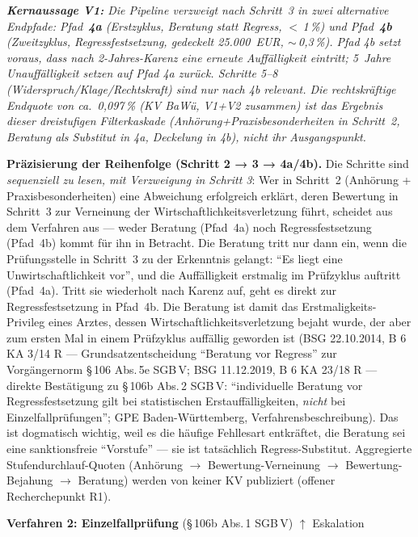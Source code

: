 \documentclass{umbruch-position}
\begin{document}
\smallskip
\noindent\textit{\textbf{Kernaussage V1:} Die Pipeline verzweigt nach Schritt~3 in zwei alternative Endpfade: Pfad~\textbf{4a} (Erstzyklus, Beratung statt Regress, $<$\,1\,\%) und Pfad~\textbf{4b} (Zweitzyklus, Regressfestsetzung, gedeckelt 25.000~EUR, $\sim$\,0,3\,\%). Pfad 4b setzt voraus, dass nach 2-Jahres-Karenz eine erneute Auffälligkeit eintritt; 5~Jahre Unauffälligkeit setzen auf Pfad 4a zurück. Schritte 5--8 (Widerspruch/Klage/Rechtskraft) sind nur nach 4b relevant. Die rechtskräftige Endquote von ca.~0,097\,\% (KV BaWü, V1+V2 zusammen) ist das \emph{Ergebnis} dieser dreistufigen Filterkaskade (Anhörung+Praxisbesonderheiten in Schritt~2, Beratung als Substitut in 4a, Deckelung in 4b), nicht ihr Ausgangspunkt.}

\smallskip
\noindent\textbf{Präzisierung der Reihenfolge (Schritt 2 → 3 → 4a/4b).} Die Schritte sind \emph{sequenziell zu lesen, mit Verzweigung in Schritt 3}: Wer in Schritt~2 (Anhörung + Praxisbesonderheiten) eine Abweichung erfolgreich erklärt, deren Bewertung in Schritt~3 zur Verneinung der Wirtschaftlichkeitsverletzung führt, scheidet aus dem Verfahren aus --- weder Beratung (Pfad~4a) noch Regressfestsetzung (Pfad~4b) kommt für ihn in Betracht. Die Beratung tritt nur dann ein, wenn die Prüfungsstelle in Schritt~3 zu der Erkenntnis gelangt: ``Es liegt eine Unwirtschaftlichkeit vor'', und die Auffälligkeit erstmalig im Prüfzyklus auftritt (Pfad~4a). Tritt sie wiederholt nach Karenz auf, geht es direkt zur Regressfestsetzung in Pfad~4b. Die Beratung ist damit das Erstmaligkeits-Privileg eines Arztes, dessen Wirtschaftlichkeitsverletzung bejaht wurde, der aber zum ersten Mal in einem Prüfzyklus auffällig geworden ist (BSG 22.10.2014, B 6 KA 3/14 R --- Grundsatzentscheidung ``Beratung vor Regress'' zur Vorgängernorm \S\,106 Abs.\,5e SGB\,V; BSG 11.12.2019, B 6 KA 23/18 R --- direkte Bestätigung zu \S\,106b Abs.\,2 SGB\,V: ``individuelle Beratung vor Regressfestsetzung gilt bei statistischen Erstauffälligkeiten, \emph{nicht} bei Einzelfallprüfungen''; GPE Baden-Württemberg, Verfahrensbeschreibung). Das ist dogmatisch wichtig, weil es die häufige Fehllesart entkräftet, die Beratung sei eine sanktionsfreie ``Vorstufe'' --- sie ist tatsächlich Regress-Substitut. Aggregierte Stufendurchlauf-Quoten (Anhörung $\to$ Bewertung-Verneinung $\to$ Bewertung-Bejahung $\to$ Beratung) werden von keiner KV publiziert (offener Recherchepunkt R1).

\medskip
\noindent\textbf{Verfahren 2: Einzelfallprüfung} (\S\,106b Abs.\,1 SGB\,V)
\hfill{\small$\uparrow$ Eskalation}
\end{document}
